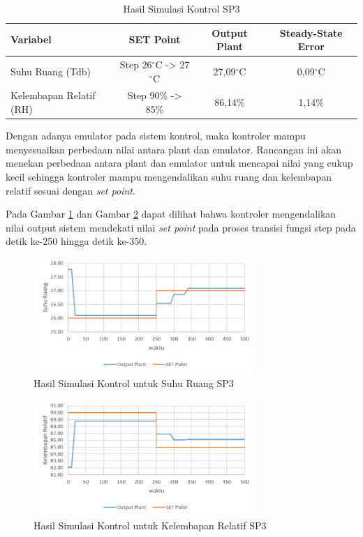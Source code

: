 \begin{table}[!h]
	\caption{Hasil Simulasi Kontrol SP3}
	\label{tbl:5:SP3Ess}
	\centering
	\begin{tabular}{|l|c|c|c|}
		\hline
		\textbf{Variabel} & \textbf{SET Point} & \textbf{Output Plant} & \textbf{Steady-State Error}\\ \hline
		Suhu Ruang (Tdb) & Step 26$^\circ$C -> 27$^\circ$C & 27,09$^\circ$C & 0,09$^\circ$C \\ \hline
		Kelembapan Relatif (RH) & Step 90\% -> 85\% & 86,14\% & 1,14\% \\ \hline
	\end{tabular}
\end{table}

Dengan adanya emulator pada sistem kontrol, maka kontroler mampu menyesuaikan perbedaan nilai antara plant dan emulator. Rancangan ini akan menekan perbedaan antara plant dan emulator untuk mencapai nilai yang cukup kecil sehingga kontroler mampu mengendalikan suhu ruang dan kelembapan relatif sesuai dengan \textit{set point}.

Pada Gambar \ref{fig:5:SimulinkSP3Td} dan Gambar \ref{fig:5:SimulinkSP3RH} dapat dilihat bahwa kontroler mengendalikan nilai output sistem mendekati nilai \textit{set point} pada proses transisi fungsi step pada detik ke-250 hingga detik ke-350.


\begin{figure}[!h]
	\centering
	\includegraphics[width=0.75\textwidth]{figures/SimulinkSP3Td}
	\caption{Hasil Simulasi Kontrol untuk Suhu Ruang SP3}
	\label{fig:5:SimulinkSP3Td}
\end{figure}
\vspace{1em}

\begin{figure}[!h]
	\centering
	\includegraphics[width=0.75\textwidth]{figures/SimulinkSP3RH}
	\caption{Hasil Simulasi Kontrol untuk Kelembapan Relatif SP3}
	\label{fig:5:SimulinkSP3RH}
\end{figure}

